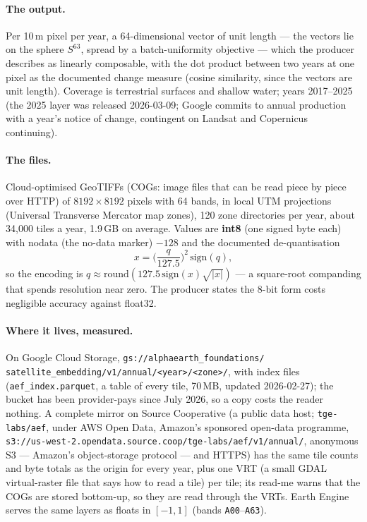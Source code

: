 \documentclass[10pt]{article}
\newcommand{\code}[1]{\texttt{#1}}
\begin{document}
\paragraph{The output.} Per 10\,m pixel per year, a 64-dimensional vector
of unit length --- the vectors lie on the sphere $S^{63}$, spread by a
batch-uniformity objective --- which the producer describes as linearly
composable, with the dot product between two years at one pixel as the
documented change measure (cosine similarity, since the vectors are unit
length). Coverage is terrestrial surfaces and shallow water; years
2017--2025 (the 2025 layer was released 2026-03-09; Google commits to annual
production with a year's notice of change, contingent on Landsat and
Copernicus continuing).

\paragraph{The files.} Cloud-optimised GeoTIFFs (COGs: image files that can be read piece by piece over HTTP) of $8192 \times 8192$ pixels
with 64 bands, in local UTM projections (Universal Transverse Mercator map zones), 120 zone directories per year,
about 34,000 tiles a year, 1.9\,GB on average. Values are \textbf{int8} (one signed byte each)
with nodata (the no-data marker) $-128$ and the documented de-quantisation
\begin{equation}
x = \Big(\frac{q}{127.5}\Big)^{2}\,\mathrm{sign}(q),
\end{equation}
so the encoding is $q \approx \mathrm{round}(127.5\,\mathrm{sign}(x)\sqrt{|x|})$
--- a square-root companding that spends resolution near zero. The producer
states the 8-bit form costs negligible accuracy against float32.

\sloppy\paragraph{Where it lives, measured.} On Google Cloud Storage, \code{gs://alphaearth\_foundations/}\allowbreak
\code{satellite\_embedding/}\allowbreak\code{v1/annual/}\allowbreak\code{<year>/<zone>/}, with index files
(\code{aef\_index.parquet}, a table of every tile, 70\,MB, updated 2026-02-27); the bucket has been
provider-pays since July 2026, so a copy costs the reader nothing. A
complete mirror on Source Cooperative (a public data host; \code{tge-labs/aef}, under AWS Open Data, Amazon's sponsored open-data programme,
\code{s3://\allowbreak us-west-2.opendata.source.coop/\allowbreak tge-labs/\allowbreak aef/\allowbreak v1/\allowbreak annual/}, anonymous
S3 --- Amazon's object-storage protocol --- and HTTPS) has the same tile counts and byte totals as the origin for
every year, plus one VRT (a small GDAL virtual-raster file that says how to read a tile) per tile; its read-me warns that the COGs are
stored bottom-up, so they are read through the VRTs. Earth Engine serves the
same layers as floats in $[-1, 1]$ (bands \code{A00}--\code{A63}).\par\fussy
\end{document}
